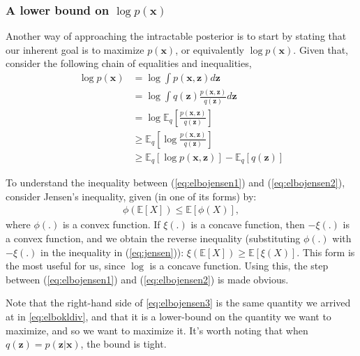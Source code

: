 \subsubsection{A lower bound on $\log p(\bm{x})$}
\label{subsubsection:elbo}

Another way of approaching the intractable posterior is to start by stating
that our inherent goal is to maximize $p(\bm{x})$, or equivalently $\log p(\bm{x})$. Given
that, consider the following chain of equalities and inequalities,
\begin{align}
    \log p(\bm{x}) &= \log \int p(\bm{x}, \bm{z}) d\bm{z}\\
    &= \log \int q(\bm{z}) \frac{p(\bm{x}, \bm{z})}{q(\bm{z})} d\bm{z} \\
    &= \log \mathbb{E}_q[\frac{p(\bm{x}, \bm{z})}{q(\bm{z})}] \label{eq:elbojensen1} \\
    &\geq \mathbb{E}_q[\log \frac{p(\bm{x}, \bm{z})}{q(\bm{z})}] \label{eq:elbojensen2} \\
    &\geq \mathbb{E}_q[\log p(\bm{x}, \bm{z})] - \mathbb{E}_q[q(\bm{z})] \label{eq:elbojensen3}
\end{align}

To understand the inequality between (\ref{eq:elbojensen1}) and (\ref{eq:elbojensen2}),
consider Jensen's inequality, given (in one of its forms) by:
\begin{align}
    \phi(\mathbb{E}[X]) \leq \mathbb{E}[\phi(X)], \label{eq:jensen}
\end{align} where $\phi(.)$ is a convex function. If $\xi(.)$ is a concave function,
then $- \xi(.)$ is a convex function, and we obtain the reverse inequality
(substituting $\phi(.)$ with $-\xi(.)$ in the inequality in (\ref{eq:jensen})):
$\xi(\mathbb{E}[X]) \geq \mathbb{E}[\xi(X)]$. This form is the most useful for
us, since $\log$ is a concave function. Using this, the step between (\ref{eq:elbojensen1})
and (\ref{eq:elbojensen2}) is made obvious.

Note that the right-hand side of \ref{eq:elbojensen3} is the same quantity
we arrived at in \ref{eq:elbokldiv}, and that it is a lower-bound on the
quantity we want to maximize, and so we want to maximize it. It's worth noting
that when $q(\bm{z}) = p(\bm{z}|\bm{x})$, the bound is tight.
